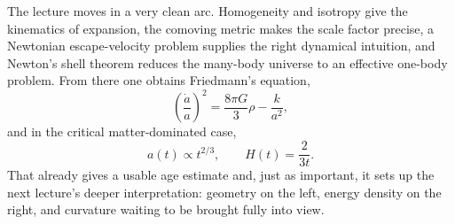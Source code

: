 The lecture moves in a very clean arc. Homogeneity and isotropy give the kinematics of expansion, the comoving metric makes the scale factor precise, a Newtonian escape-velocity problem supplies the right dynamical intuition, and Newton's shell theorem reduces the many-body universe to an effective one-body problem. From there one obtains Friedmann's equation,
\begin{equation}
\left(\frac{\dot a}{a}\right)^2=\frac{8\pi G}{3}\rho-\frac{k}{a^2},
\end{equation}
and in the critical matter-dominated case,
\begin{equation}
a(t)\propto t^{2/3}, \qquad H(t)=\frac{2}{3t}.
\end{equation}
That already gives a usable age estimate and, just as important, it sets up the next lecture's deeper interpretation: geometry on the left, energy density on the right, and curvature waiting to be brought fully into view.